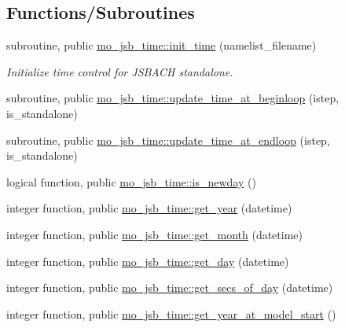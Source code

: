 \subsection*{Functions/\+Subroutines}
\begin{DoxyCompactItemize}
\item 
subroutine, public \hyperlink{namespacemo__jsb__time_af406b57a3b7ee99184a5ca90996d63de}{mo\+\_\+jsb\+\_\+time\+::init\+\_\+time} (namelist\+\_\+filename)
\begin{DoxyCompactList}\small\item\em Initialize time control for J\+S\+B\+A\+C\+H standalone. \end{DoxyCompactList}\item 
subroutine, public \hyperlink{namespacemo__jsb__time_a730df761753fbbdb7d42e0a8df801907}{mo\+\_\+jsb\+\_\+time\+::update\+\_\+time\+\_\+at\+\_\+beginloop} (istep, is\+\_\+standalone)
\item 
subroutine, public \hyperlink{namespacemo__jsb__time_ac894ecb723bd71f8506bff6f279e323e}{mo\+\_\+jsb\+\_\+time\+::update\+\_\+time\+\_\+at\+\_\+endloop} (istep, is\+\_\+standalone)
\item 
logical function, public \hyperlink{namespacemo__jsb__time_aaf4eeda4cb187ded221b00e4fd1c3448}{mo\+\_\+jsb\+\_\+time\+::is\+\_\+newday} ()
\item 
integer function, public \hyperlink{namespacemo__jsb__time_adf7b7e4156df6e151e9274d0d94dc601}{mo\+\_\+jsb\+\_\+time\+::get\+\_\+year} (datetime)
\item 
integer function, public \hyperlink{namespacemo__jsb__time_a58e1d9b59545569a0eced95aca165c58}{mo\+\_\+jsb\+\_\+time\+::get\+\_\+month} (datetime)
\item 
integer function, public \hyperlink{namespacemo__jsb__time_a6b454a27050a101777b380f81321b779}{mo\+\_\+jsb\+\_\+time\+::get\+\_\+day} (datetime)
\item 
integer function, public \hyperlink{namespacemo__jsb__time_aa3a34d4460604cad784963d39ca47fbe}{mo\+\_\+jsb\+\_\+time\+::get\+\_\+secs\+\_\+of\+\_\+day} (datetime)
\item 
integer function, public \hyperlink{namespacemo__jsb__time_a9dd8cce6102dffffa97513d7b4d2e45b}{mo\+\_\+jsb\+\_\+time\+::get\+\_\+year\+\_\+at\+\_\+model\+\_\+start} ()
\end{DoxyCompactItemize}
